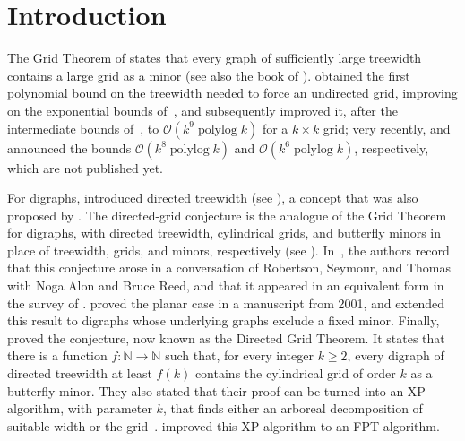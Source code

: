 \documentclass[fontsize=12pt,leading=14pt]{fullpaper}
\newcommand{\NN}{\mathbb{N}}
\begin{document}
\clearpage
\setcounter{tocdepth}{1}
\tableofcontents\label{front:contents}
\clearpage

%
\section{Introduction}\label{sec:intro}

The Grid Theorem of \textcite{RobertsonSeymour86} states that every graph of sufficiently large treewidth contains a large grid as a minor (see also the book of \textcite[Chapter~12]{Diestel17}).
\textcite{CC16} obtained the first polynomial bound on the treewidth needed to force an undirected grid, improving on the exponential bounds of~\cite{RST94,DJGT99,KawarabayashiK20,LeafS15}, and \textcite{CT21} subsequently improved it, after the intermediate bounds of~\cite{Chuzhoy15,Chuzhoy16}, to $\mathcal{O}(k^9\operatorname{polylog}k)$ for a $k\times k$ grid; very recently, \textcite{Bonnet26} and \textcite{Hajiaghayi26} announced the bounds $\mathcal{O}(k^8\operatorname{polylog}k)$ and $\mathcal{O}(k^6\operatorname{polylog}k)$, respectively, which are not published yet.

For digraphs, \textcite{Johnson2001} introduced directed treewidth (see ), a concept that was also proposed by \textcite{Reed99}.
The directed-grid conjecture is the analogue of the Grid Theorem for digraphs, with directed treewidth, cylindrical grids, and butterfly minors in place of treewidth, grids, and minors, respectively (see ).
In~\cite[Section~5]{Johnson2001}, the authors record that this conjecture arose in a conversation of Robertson, Seymour, and Thomas with Noga Alon and Bruce Reed, and that it appeared in an equivalent form in the survey of \textcite{Reed97}.
\textcite{JRSTplanar} proved the planar case in a manuscript from 2001, and \textcite{KK14} extended this result to digraphs whose underlying graphs exclude a fixed minor.
Finally, \textcite{KawarabayashiK15} proved the conjecture, now known as the Directed Grid Theorem.
It states that there is a function $f \colon \NN \to \NN$ such that, for every integer $k\ge2$, every digraph of directed treewidth at least $f(k)$ contains the cylindrical grid of order $k$ as a butterfly minor.
They also stated that their proof can be turned into an XP algorithm, with parameter $k$, that finds either an arboreal decomposition of suitable width or the grid~\cite[Theorem~1.3]{KawarabayashiK15}.
\textcite{CLMS22} improved this XP algorithm to an FPT algorithm.
\end{document}
